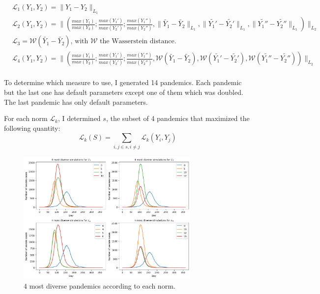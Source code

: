 $
\begin{aligned}
    &\mathcal{L}_1(Y_1, Y_2) = \| Y_1 - Y_2 \|_{L_1}  \\
    &\mathcal{L}_2(Y_1, Y_2) = \| (\frac{max(Y_1)}{max(Y_2)} ;\frac{max(Y_1')}{max(Y_2')} ; \frac{max(Y_1'')}{max(Y_2'')} , \| \tilde{Y_1} - \tilde{Y_2} \|_{L_1}, \| \tilde{Y_1'} - \tilde{Y_2'} \|_{L_1} , \| \tilde{Y_1''} - \tilde{Y_2''} \|_{L_1} ) \|_{L_2} \\
    &\mathcal{L}_3 = \mathcal{W}(\tilde{Y_1} - \tilde{Y_2}) \text{, with }\mathcal{W} \text{ the Wasserstein distance.} \\
    &\mathcal{L}_4(Y_1, Y_2) = \| (\frac{max(Y_1)}{max(Y_2)} ;\frac{max(Y_1')}{max(Y_2')} ; \frac{max(Y_1'')}{max(Y_2'')} , \mathcal{W} (\tilde{Y_1} - \tilde{Y_2} ),\mathcal{W} ( \tilde{Y_1'} - \tilde{Y_2'} ) , \mathcal{W} (\tilde{Y_1''} - \tilde{Y_2''} ) ) \|_{L_2} \\
\end{aligned}
$


To determine which measure to use, I generated 14 pandemics. 
Each pandemic but the last one has default parameters except one of them which was doubled. 
The last pandemic has only default parameters. 

For each norm $\mathcal{L}_k$, I determined $s$,  the subset of 4 pandemics that maximized the following quantity:\\

\[ \mathcal{L}_k(S) = \sum_{i, j \in s, i \neq j} \mathcal{L}_k(Y_i, Y_j) \]

\begin{figure}
    \centering
    \includegraphics[width=0.8\textwidth]{figures/most_different_pandemics.png}
    \caption{4 most diverse pandemics according to each norm.}
    \label{fig:diversity_pandemics}
\end{figure}


